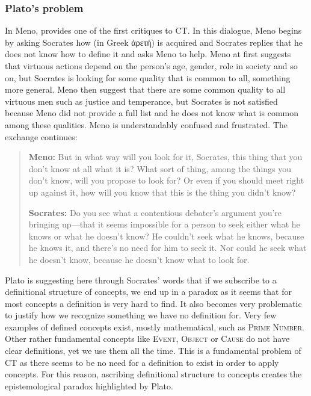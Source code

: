 \subsubsection*{Plato's problem}
\label{sec:platosproblem}
In Meno, \citeauthor{Plato1998} provides one of the first critiques to CT. In this dialogue, Meno begins by asking Socrates how  (in Greek ἀρετή) is acquired and Socrates replies that he does not know how to define it and asks Meno to help. Meno at first suggests that virtuous actions depend on the person's age, gender, role in society and so on, but Socrates is looking for some quality that is common to all, something more general. Meno then suggest that there are some common quality to all virtuous men such as justice and temperance, but Socrates is not satisfied because Meno did not provide a full list and he does not know what is common among these qualities. Meno is understandably confused and frustrated. The exchange continues:
\SetCiteCommand{\transcite}
\blockcquote[Meno, 80d-e]{Plato1998}{
	\textbf{Meno:} But in what way will you look for it, Socrates, this thing that you don't know at all what it is? What sort of thing, among the things you don't know, will you propose to look for? Or even if you should meet right up against it, how will you know that this is the thing you didn't know?
	
	\textbf{Socrates:} Do you see what a contentious debater's argument you're bringing up—that it seems impossible for a person to seek either what he knows or what he doesn't know? He couldn't seek what he knows, because he knows it, and there's no need for him to seek it. Nor could he seek what he doesn't know, because he doesn't know what to look for.
}
\SetCiteCommand{\citep}

Plato is suggesting here through Socrates' words that if we subscribe to a definitional structure of concepts, we end up in a paradox as it seems that for most concepts a definition is very hard to find. It also becomes very problematic to justify how we recognize something we have no definition for. Very few examples of defined concepts exist, mostly mathematical, such as \textsc{Prime Number}. Other rather fundamental concepts like \textsc{Event}, \textsc{Object} or \textsc{Cause} do not have clear definitions, yet we use them all the time. This is a fundamental problem of CT as there seems to be no need for a definition to exist in order to apply concepts. For this reason, ascribing definitional structure to concepts creates the epistemological paradox highlighted by Plato.

